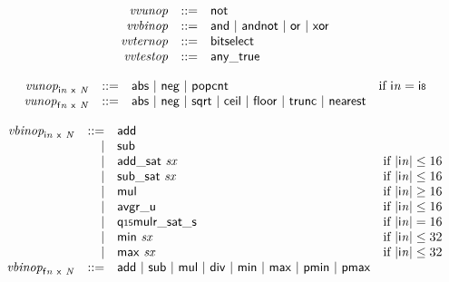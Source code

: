 $$
\begin{array}{@{}lrrl@{}l@{}}
& {\mathit{vvunop}} &::=& \mathsf{not} \\
& {\mathit{vvbinop}} &::=& \mathsf{and} ~|~ \mathsf{andnot} ~|~ \mathsf{or} ~|~ \mathsf{xor} \\
& {\mathit{vvternop}} &::=& \mathsf{bitselect} \\
& {\mathit{vvtestop}} &::=& \mathsf{any\_true} \\
\end{array}
$$

$$
\begin{array}{@{}lrrl@{}l@{}}
& {{\mathit{vunop}}}_{{\mathsf{i}}{{\mathit{n}}}~\mathsf{x}~{\mathit{N}}} &::=& \mathsf{abs} ~|~ \mathsf{neg} ~|~ \mathsf{popcnt} &\quad
  \mbox{if}~{\mathsf{i}}{{\mathit{n}}} = \mathsf{i{\scriptstyle8}} \\
& {{\mathit{vunop}}}_{{\mathsf{f}}{{\mathit{n}}}~\mathsf{x}~{\mathit{N}}} &::=& \mathsf{abs} ~|~ \mathsf{neg} ~|~ \mathsf{sqrt} ~|~ \mathsf{ceil} ~|~ \mathsf{floor} ~|~ \mathsf{trunc} ~|~ \mathsf{nearest} \\
\end{array}
$$

$$
\begin{array}{@{}lrrl@{}l@{}}
& {{\mathit{vbinop}}}_{{\mathsf{i}}{{\mathit{n}}}~\mathsf{x}~{\mathit{N}}} &::=& \mathsf{add} \\ &&|&
\mathsf{sub} \\ &&|&
\mathsf{add\_sat}~{\mathit{sx}} &\quad
  \mbox{if}~{|{\mathsf{i}}{{\mathit{n}}}|} \leq 16 \\ &&|&
\mathsf{sub\_sat}~{\mathit{sx}} &\quad
  \mbox{if}~{|{\mathsf{i}}{{\mathit{n}}}|} \leq 16 \\ &&|&
\mathsf{mul} &\quad
  \mbox{if}~{|{\mathsf{i}}{{\mathit{n}}}|} \geq 16 \\ &&|&
\mathsf{avgr\_u} &\quad
  \mbox{if}~{|{\mathsf{i}}{{\mathit{n}}}|} \leq 16 \\ &&|&
\mathsf{q{\scriptstyle15}mulr\_sat\_s} &\quad
  \mbox{if}~{|{\mathsf{i}}{{\mathit{n}}}|} = 16 \\ &&|&
\mathsf{min}~{\mathit{sx}} &\quad
  \mbox{if}~{|{\mathsf{i}}{{\mathit{n}}}|} \leq 32 \\ &&|&
\mathsf{max}~{\mathit{sx}} &\quad
  \mbox{if}~{|{\mathsf{i}}{{\mathit{n}}}|} \leq 32 \\
& {{\mathit{vbinop}}}_{{\mathsf{f}}{{\mathit{n}}}~\mathsf{x}~{\mathit{N}}} &::=& \mathsf{add} ~|~ \mathsf{sub} ~|~ \mathsf{mul} ~|~ \mathsf{div} ~|~ \mathsf{min} ~|~ \mathsf{max} ~|~ \mathsf{pmin} ~|~ \mathsf{pmax} \\
\end{array}
$$

